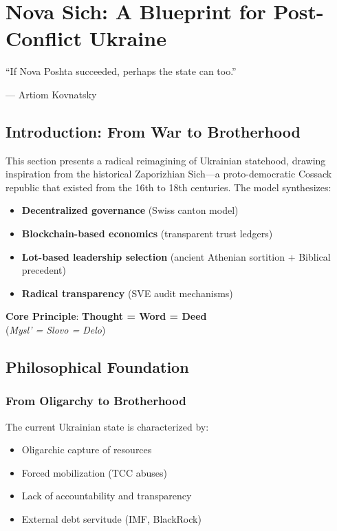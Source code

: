 \documentclass[11pt,a4paper]{article}
\theoremstyle{definition}
\theoremstyle{remark}
\begin{document}

\section{Nova Sich: A Blueprint for Post-Conflict Ukraine}
\label{sec:nova_sich}

\epigraph{``If Nova Poshta succeeded, perhaps the state can too.''}{--- Artiom Kovnatsky}

\subsection{Introduction: From War to Brotherhood}

This section presents a radical reimagining of Ukrainian statehood, drawing inspiration from the historical Zaporizhian Sich—a proto-democratic Cossack republic that existed from the 16th to 18th centuries. The model synthesizes:

\begin{itemize}
\item \textbf{Decentralized governance} (Swiss canton model)
\item \textbf{Blockchain-based economics} (transparent trust ledgers)
\item \textbf{Lot-based leadership selection} (ancient Athenian sortition + Biblical precedent)
\item \textbf{Radical transparency} (SVE audit mechanisms)
\end{itemize}

\textbf{Core Principle}: \textbf{Thought = Word = Deed} \\
(\textit{Mysl' = Slovo = Delo})

\subsection{Philosophical Foundation}

\subsubsection{From Oligarchy to Brotherhood}

The current Ukrainian state is characterized by:
\begin{itemize}
\item Oligarchic capture of resources
\item Forced mobilization (TCC abuses)
\item Lack of accountability and transparency
\item External debt servitude (IMF, BlackRock)
\end{itemize}
\end{document}
